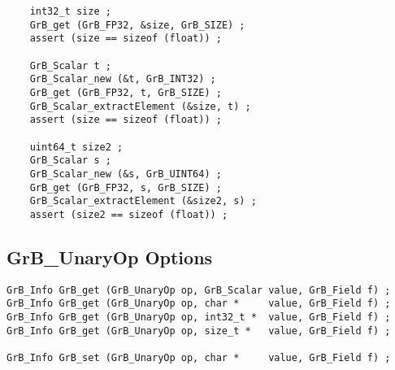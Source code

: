 {\footnotesize
\begin{verbatim}
    int32_t size ;
    GrB_get (GrB_FP32, &size, GrB_SIZE) ;
    assert (size == sizeof (float)) ;

    GrB_Scalar t ;
    GrB_Scalar_new (&t, GrB_INT32) ;
    GrB_get (GrB_FP32, t, GrB_SIZE) ;
    GrB_Scalar_extractElement (&size, t) ;
    assert (size == sizeof (float)) ;

    uint64_t size2 ;
    GrB_Scalar s ;
    GrB_Scalar_new (&s, GrB_UINT64) ;
    GrB_get (GrB_FP32, s, GrB_SIZE) ;
    GrB_Scalar_extractElement (&size2, s) ;
    assert (size2 == sizeof (float)) ; \end{verbatim}}

\newpage
\subsection{{\sf GrB\_UnaryOp} Options}
\label{get_set_unop}

\begin{mdframed}[userdefinedwidth=6in]
{\footnotesize
\begin{verbatim}
GrB_Info GrB_get (GrB_UnaryOp op, GrB_Scalar value, GrB_Field f) ;
GrB_Info GrB_get (GrB_UnaryOp op, char *     value, GrB_Field f) ;
GrB_Info GrB_get (GrB_UnaryOp op, int32_t *  value, GrB_Field f) ;
GrB_Info GrB_get (GrB_UnaryOp op, size_t *   value, GrB_Field f) ;

GrB_Info GrB_set (GrB_UnaryOp op, char *     value, GrB_Field f) ;
\end{verbatim}
}\end{mdframed}

